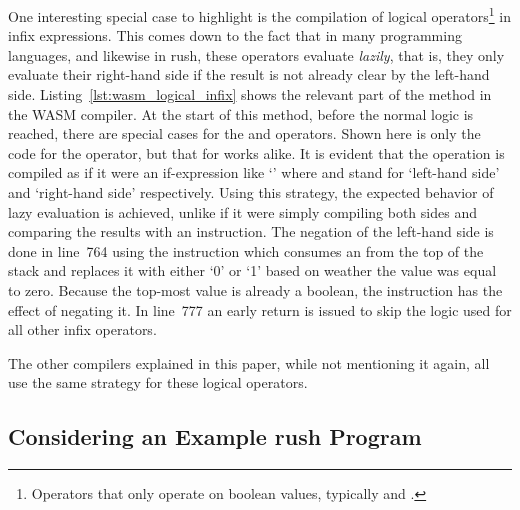 One interesting special case to highlight is the compilation of logical operators\footnote{Operators that only operate on boolean values, typically \qVerb{&&} and \qVerb{||}.} in infix expressions.
This comes down to the fact that in many programming languages, and likewise in rush, these operators evaluate \emph{lazily}, that is, they only evaluate their right-hand side if the result is not already clear by the left-hand side.
Listing~\ref{lst:wasm_logical_infix} shows the relevant part of the  method in the WASM compiler.
At the start of this method, before the normal logic is reached, there are special cases for the \qVerb{&&} and \qVerb{||} operators.
Shown here is only the code for the \qVerb{&&} operator, but that for \qVerb{||} works alike.
It is evident that the operation is compiled as if it were an if-expression like `' where  and  stand for `left-hand side' and `right-hand side' respectively.
Using this strategy, the expected behavior of lazy evaluation is achieved, unlike if it were simply compiling both sides and comparing the results with an  instruction.
The negation of the left-hand side is done in line~764 using the  instruction which consumes an  from the top of the stack and replaces it with either `0' or `1' based on weather the value was equal to zero.
Because the top-most value is already a boolean, the instruction has the effect of negating it.
In line~777 an early return is issued to skip the logic used for all other infix operators.

The other compilers explained in this paper, while not mentioning it again, all use the same strategy for these logical operators.

\subsection{Considering an Example rush Program}


